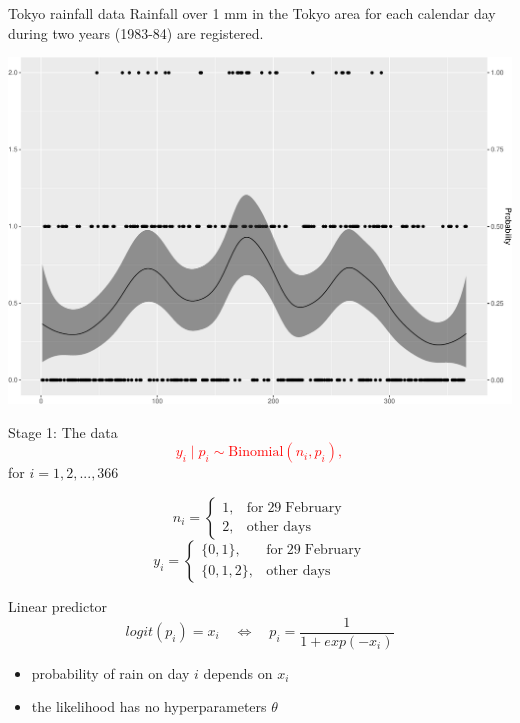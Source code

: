 \documentclass[
  ignorenonframetext,
]{beamer}
\providecommand{\tightlist}{%
  \setlength{\itemsep}{0pt}\setlength{\parskip}{0pt}}
\begin{document}
\begin{frame}{Tokyo rainfall data}
\protect\hypertarget{tokyo-rainfall-data}{}
Rainfall over 1 mm in the Tokyo area for each calendar day during two
years (1983-84) are registered.

\begin{center}\includegraphics[width=0.6\linewidth]{Part1_intro_files/figure-beamer/unnamed-chunk-9-1} \end{center}
\end{frame}

\begin{frame}{Stage 1: The data}
\protect\hypertarget{stage-1-the-data}{}
\textcolor{red}{
$$
y_i\mid p_i \sim \text{Binomial}(n_i, p_i),
$$} for \(i=1,2,...,366\)

\[
n_{i} = \left\{
 \begin{array}{lr}
1, & \text{for}\; 29\; \text{February}\\
2, & \text{other days}
\end{array}\right.
\] \[
y_{i} =
\begin{cases}
\{0,1\}, & \text{for}\; 29\; \text{February}\\
\{0,1,2\}, & \text{other days}
 \end{cases}       
\]

Linear predictor \[
logit(p_i) = x_i \quad \Leftrightarrow \quad p_i = \frac{1}{1+exp(-x_i)}
\]

\begin{itemize}
\tightlist
\item
  probability of rain on day \(i\) depends on \(x_i\)
\item
  the likelihood has no hyperparameters \(\theta\)
\end{itemize}
\end{frame}
\end{document}
